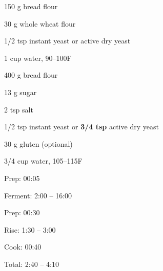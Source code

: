 \documentclass[oneside]{book}  %
\newcommand{\degF}{\textdegree F\xspace}
\begin{document}
\begin{IT}[0.753]
  \begin{ingredients}[title=Biga Ingredients]
    \item[150 g] bread flour
    \item[30 g] whole wheat flour
    \item[1/2 tsp] instant yeast or active dry yeast
    \item[1 cup] water, 90--100\degF
  \end{ingredients}
  \begin{ingredients}[title=Bread Ingredients]
    \item[400 g] bread flour
    \item[13 g] sugar
    \item[2 tsp] salt
    \item[1/2 tsp] instant yeast or \textbf{3/4 tsp} active dry yeast
    \item[30 g] gluten (optional)
    \item[3/4 cup] water, 105--115\degF
  \end{ingredients}

  \switchcolumn

  \begin{timeline}
    \item[Prep:]  00:05
    \item[Ferment:]  2:00 -- 16:00
  \end{timeline}
  \begin{timeline}
    \item[Prep:] 00:30
    \item[Rise:] 1:30 -- 3:00
    \item[Cook:] 00:40
    \item[Total:] 2:40 -- 4:10
  \end{timeline}
\end{IT}
\end{document}
